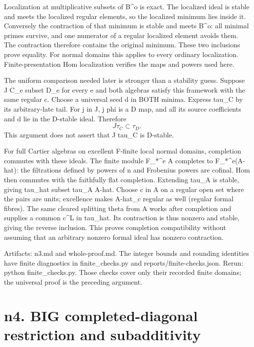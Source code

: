 \documentclass[11pt]{article}
\begin{document}
Localization at multiplicative subsets of B\textasciicircum{}o is exact. The localized ideal is stable and meets the localized regular elements, so the localized minimum lies inside it. Conversely the contraction of that minimum is stable and meets B\textasciicircum{}o: all minimal primes survive, and one numerator of a regular localized element avoids them. The contraction therefore contains the original minimum. These two inclusions prove equality. For normal domains this applies to every ordinary localization. Finite-presentation Hom localization verifies the maps and powers used here.

The uniform comparison needed later is stronger than a stability guess. Suppose J C\_e subset D\_e for every e and both algebras satisfy this framework with the same regular c. Choose a universal seed d in BOTH minima. Express tau\_C by its arbitrary-late tail. For j in J, j phi is a D map, and all its source coefficients and d lie in the D-stable ideal. Therefore
\[
J\tau_C\subset\tau_D.
\]
This argument does not assert that J tau\_C is D-stable.

For full Cartier algebras on excellent F-finite local normal domains, completion commutes with these ideals. The finite module F\_*\textasciicircum{}e A completes to F\_*\textasciicircum{}e(A-hat): the filtrations defined by powers of n and Frobenius powers are cofinal. Hom then commutes with the faithfully flat completion. Extending tau\_A is stable, giving tau\_hat subset tau\_A A-hat. Choose c in A on a regular open set where the pairs are units; excellence makes A-hat\_c regular as well (regular formal fibres). The same cleared splitting theta from A works after completion and supplies a common c\textasciicircum{}L in tau\_hat. Its contraction is thus nonzero and stable, giving the reverse inclusion. This proves completion compatibility without assuming that an arbitrary nonzero formal ideal has nonzero contraction.

Artifacts: n3.md and whole-proof.md. The integer bounds and rounding identities have finite diagnostics in finite\_checks.py and reports/finite-checks.json. Rerun: python finite\_checks.py. Those checks cover only their recorded finite domains; the universal proof is the preceding argument.

\section{n4. BIG completed-diagonal restriction and subadditivity}
\end{document}
